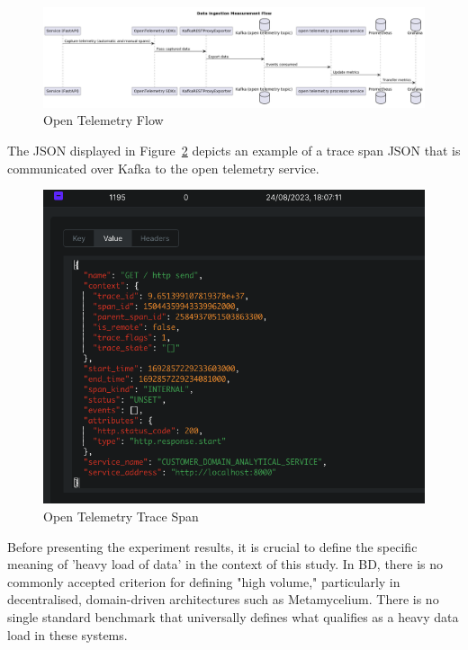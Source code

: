 \documentclass[journal]{IEEEtran}
\begin{document}
\begin{figure}[h]
  \centering
  \includegraphics[width=\textwidth]{images/open-telemetry-flow.png}
  \caption{Open Telemetry Flow}
  \label{openTelemetryFlow}
\end{figure}

The JSON displayed in Figure~\ref{openTelemetryTraceSpan} depicts an example of a trace span JSON that is communicated over Kafka to the open telemetry service.

\begin{figure}[h!]
  \centering
  \includegraphics[width=\columnwidth]{images/open-telemetry-trace-example.png}
  \caption{Open Telemetry Trace Span}
  \label{openTelemetryTraceSpan}
\end{figure}

Before presenting the experiment results, it is crucial to define the specific meaning of 'heavy load of data' in the context of this study. In BD, there is no commonly accepted criterion for defining "high volume," particularly in decentralised, domain-driven architectures such as Metamycelium. There is no single standard benchmark that universally defines what qualifies as a heavy data load in these systems. 
\end{document}
